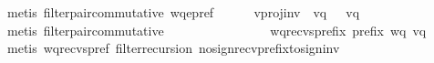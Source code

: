 \begin{isabellebody}
\ {\isacharparenleft}{\kern0pt}metis\ filter{\isacharunderscore}{\kern0pt}pair{\isacharunderscore}{\kern0pt}commutative\ wq{\isacharunderscore}{\kern0pt}e{\isacharunderscore}{\kern0pt}pref{\isacharparenright}{\kern0pt}\isanewline
\ \ \ \ \isamarkupfalse%
\ v{\isacharprime}{\kern0pt}{\isacharunderscore}{\kern0pt}proj{\isacharunderscore}{\kern0pt}inv{\isacharcolon}{\kern0pt}\ {\isachardoublequoteopen}\ {\isacharparenleft}{\kern0pt}{\isacharparenleft}{\kern0pt}{\isacharparenleft}{\kern0pt}{\isacharparenleft}{\kern0pt}{\isacharquery}{\kern0pt}v{\isacharprime}{\kern0pt}{\isacharparenright}{\kern0pt}{\isasymdown}\isactrlsub {\isacharquery}{\kern0pt}{\isacharparenright}{\kern0pt}{\isasymdown}\isactrlsub q{\isacharparenright}{\kern0pt}{\isasymdown}\isactrlsub {\isacharbang}{\kern0pt}\isactrlsub {\isacharquery}{\kern0pt}{\isacharparenright}{\kern0pt}\ {\isacharequal}{\kern0pt}\ \ {\isacharparenleft}{\kern0pt}{\isacharparenleft}{\kern0pt}{\isacharparenleft}{\kern0pt}{\isacharparenleft}{\kern0pt}{\isacharquery}{\kern0pt}v{\isacharprime}{\kern0pt}{\isacharparenright}{\kern0pt}{\isasymdown}\isactrlsub q{\isacharparenright}{\kern0pt}{\isasymdown}\isactrlsub {\isacharquery}{\kern0pt}{\isacharparenright}{\kern0pt}{\isasymdown}\isactrlsub {\isacharbang}{\kern0pt}\isactrlsub {\isacharquery}{\kern0pt}{\isacharparenright}{\kern0pt}{\isachardoublequoteclose}\ \isamarkupfalse%
\ {\isacharparenleft}{\kern0pt}metis\ filter{\isacharunderscore}{\kern0pt}pair{\isacharunderscore}{\kern0pt}commutative{\isacharparenright}{\kern0pt}\isanewline
\ \ \ \ \ \ \ \ \isanewline
\ \ \ \ \isamarkupfalse%
\ \isamarkupfalse%
\ wq{\isacharunderscore}{\kern0pt}recvs{\isacharunderscore}{\kern0pt}prefix{\isacharcolon}{\kern0pt}\ {\isachardoublequoteopen}prefix\ {\isacharparenleft}{\kern0pt}wq{\isasymdown}\isactrlsub {\isacharquery}{\kern0pt}{\isacharparenright}{\kern0pt}\ {\isacharparenleft}{\kern0pt}{\isacharparenleft}{\kern0pt}{\isacharparenleft}{\kern0pt}{\isacharquery}{\kern0pt}v{\isacharprime}{\kern0pt}{\isacharparenright}{\kern0pt}{\isasymdown}\isactrlsub q{\isacharparenright}{\kern0pt}{\isasymdown}\isactrlsub {\isacharquery}{\kern0pt}{\isacharparenright}{\kern0pt}{\isachardoublequoteclose}\ \ \isamarkupfalse%
\ {\isacharparenleft}{\kern0pt}metis\ wq{\isacharunderscore}{\kern0pt}recvs{\isacharunderscore}{\kern0pt}pref\ filter{\isacharunderscore}{\kern0pt}recursion\ no{\isacharunderscore}{\kern0pt}sign{\isacharunderscore}{\kern0pt}recv{\isacharunderscore}{\kern0pt}prefix{\isacharunderscore}{\kern0pt}to{\isacharunderscore}{\kern0pt}sign{\isacharunderscore}{\kern0pt}inv{\isacharparenright}{\kern0pt}\isanewline

\end{isabellebody}
